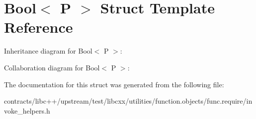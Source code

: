 \hypertarget{struct_bool}{}\section{Bool$<$ P $>$ Struct Template Reference}
\label{struct_bool}


Inheritance diagram for Bool$<$ P $>$\+:


Collaboration diagram for Bool$<$ P $>$\+:


The documentation for this struct was generated from the following file\+:\begin{DoxyCompactItemize}
\item 
contracts/libc++/upstream/test/libcxx/utilities/function.\+objects/func.\+require/invoke\+\_\+helpers.\+h\end{DoxyCompactItemize}
